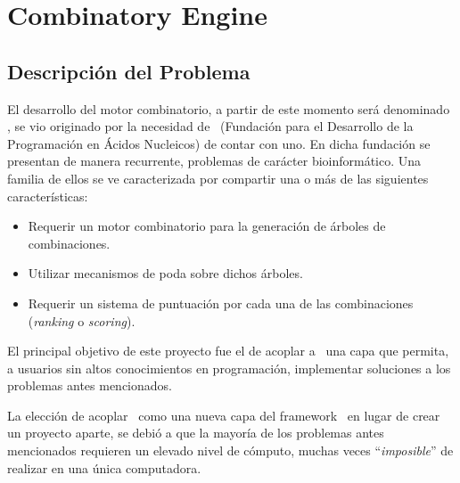 \chapter{Combinatory Engine}
    \section{Descripci\'on del Problema}\label{descripcionproblema}
        El desarrollo del motor combinatorio, a partir de este momento ser\'a denominado \combeng, se vio originado por la necesidad de \fudepan \
        (Fundaci\'on para el Desarrollo de la Programaci\'on en \'Acidos Nucleicos) de contar con uno. En dicha fundaci\'on se presentan de ma\-ne\-ra
        recurrente, problemas de car\'acter bioinform\'atico. Una familia de ellos se ve caracterizada por compartir una o m\'as de las siguientes
        caracter\'isticas:
        \begin{itemize}
            \item Requerir un motor combinatorio para la generaci\'on de \'arboles de combinaciones.
            \item Utilizar mecanismos de poda sobre dichos \'arboles.
            \item Requerir un sistema de puntuaci\'on por cada una de las combinaciones (\textit{ranking} o \textit{scoring}).
        \end{itemize}

		El principal objetivo de este proyecto fue el de acoplar a \fud \ una capa que permita, a usuarios sin altos conocimientos en programaci\'on, 
		implementar soluciones a los problemas antes mencionados.

		La elecci\'on de acoplar \combeng \ como una nueva capa del framework \fud \ en lugar de crear un proyecto aparte, se debi\'o a que la mayor\'ia de los 
    problemas antes mencionados requieren un elevado nivel de c\'omputo, muchas veces ``\textit{imposible}'' de realizar en una \'unica computadora.

  \newpage
